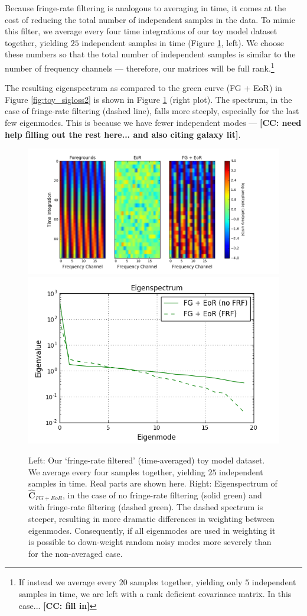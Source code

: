 \documentclass[preprint2,numberedappendix,tighten]{aastex6}  %
\newcommand{\cc}[1]{{\color{purple} \textbf{[CC: #1]}}}
\begin{document}
Because fringe-rate filtering is analogous to averaging in time, it comes at the cost of reducing the total number of independent samples in the data. To mimic this filter, we average every four time integrations of our toy model dataset together, yielding $25$ independent samples in time (Figure \ref{fig:toy_sigloss5}, left). We choose these numbers so that the total number of independent samples is similar to the number of frequency channels --- therefore, our matrices will be full rank.\footnote{If instead we average every $20$ samples together, yielding only $5$ independent samples in time, we are left with a rank deficient covariance matrix. In this case... \cc{fill in}}

The resulting eigenspectrum as compared to the green curve (FG + EoR) in Figure \ref{fig:toy_sigloss2} is shown in Figure \ref{fig:toy_sigloss5} (right plot). The spectrum, in the case of fringe-rate filtering (dashed line), falls more steeply, especially for the last few eigenmodes. This is because we have fewer independent modes --- \cc{need help filling out the rest here... and also citing galaxy lit}.

\begin{figure}
	\centering
	\includegraphics[trim={1.5cm 0.2cm 1.5cm 0.3cm},clip,height=0.29\textwidth]{plots/toy_sigloss5.png}
	\includegraphics[trim={0.3cm 0.2cm 0.3cm 0.3cm},clip,height=0.29\textwidth]{plots/toy_sigloss15.png}
	\caption{Left: Our `fringe-rate filtered' (time-averaged) toy model dataset. We average every four samples together, yielding $25$ independent samples in time. Real parts are shown here. Right: Eigenspectrum of $\hat{\textbf{C}}_{FG+EoR}$, in the case of no fringe-rate filtering (solid green) and with fringe-rate filtering (dashed green). The dashed spectrum is steeper, resulting in more dramatic differences in weighting between eigenmodes. Consequently, if all eigenmodes are used in weighting it is possible to down-weight random noisy modes more severely than for the non-averaged case.}
	\label{fig:toy_sigloss5}
\end{figure}
\end{document}
